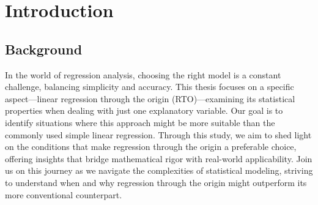 \documentclass[12pt,a4paper,oneside]{book} %
\newcommand{\hsp}{\hspace{20pt}}
\begin{document}

	\frontmatter
	
	\setcounter{tocdepth}{1}
	\tableofcontents
	\listoftables
	\listoffigures
		
	\mainmatter
	
	\pagestyle{plain}
	
	\titleformat{\chapter}[display]{\normalfont\huge\bfseries}{\chaptertitlename\ \thechapter}{20pt}{\Huge}
	\titlespacing*{\chapter}{10pt}{20pt}{40pt}
	 
	\titleformat{\chapter}[hang]{\Huge\bfseries}{\thechapter.\hsp}{0pt}{\Huge\bfseries} 
	  
	\chapter{Introduction}
			
	\section{Background}
	In the world of regression analysis, choosing the right model is a constant challenge, balancing simplicity and accuracy. This thesis focuses on a specific aspect—linear regression through the origin (RTO)—examining its statistical properties when dealing with just one explanatory variable. Our goal is to identify situations where this approach might be more suitable than the commonly used simple linear regression. Through this study, we aim to shed light on the conditions that make regression through the origin a preferable choice, offering insights that bridge mathematical rigor with real-world applicability. Join us on this journey as we navigate the complexities of statistical modeling, striving to understand when and why regression through the origin might outperform its more conventional counterpart.
	
\end{document}
